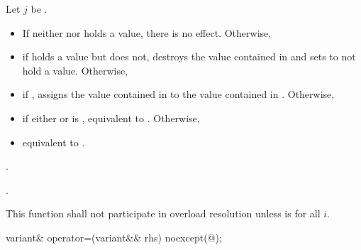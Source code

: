 \begin{itemdescr}
\pnum
Let $j$ be .

\pnum
\effects
\begin{itemize}
\item
If neither  nor  holds a value, there is no effect.  Otherwise,
\item
if  holds a value but  does not, destroys the value
contained in  and sets  to not hold a value.  Otherwise,
\item
if , assigns the value contained in 
to the value contained in . Otherwise,
\item
if either  or
 is ,
equivalent to . Otherwise,
\item
equivalent to .
\end{itemize}

\pnum
\returns {}.

\pnum
\postconditions {}.

\pnum
\remarks
This function shall not participate in overload resolution unless
is  for all $i$.
\end{itemdescr}

%
\begin{itemdecl}
variant& operator=(variant&& rhs) noexcept(@\seebelow@);
\end{itemdecl}

